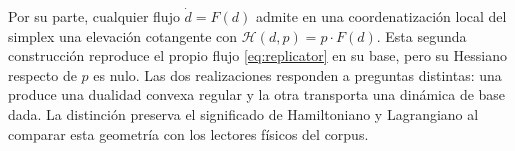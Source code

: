 Por su parte, cualquier flujo \(\dot d=F(d)\) admite en una coordenatización local
del simplex una elevación cotangente con
\(\mathscr H(d,p)=p\cdot F(d)\). Esta segunda construcción reproduce
el propio flujo \eqref{eq:replicator} en su base, pero su Hessiano respecto
de \(p\) es nulo. Las dos realizaciones responden a preguntas distintas:
una produce una dualidad convexa regular y la otra transporta una dinámica
de base dada. La distinción preserva el significado de Hamiltoniano y
Lagrangiano al comparar esta geometría con los lectores físicos del corpus.
